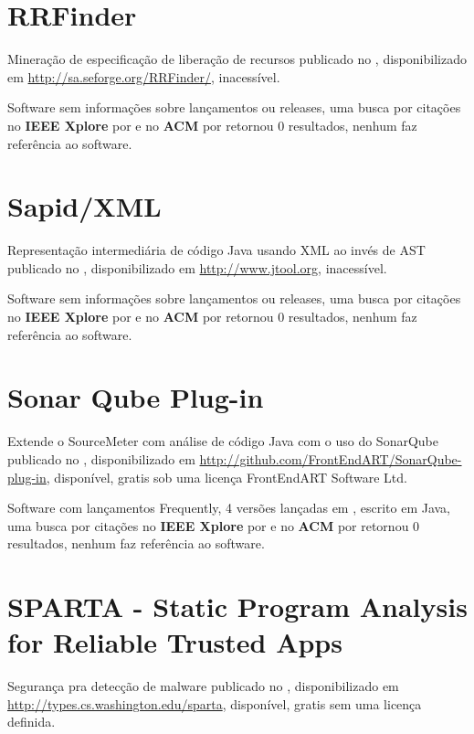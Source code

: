 \section{RRFinder}

Mineração de especificação de liberação de recursos
publicado no  ,
disponibilizado em \url{http://sa.seforge.org/RRFinder/},
inacessível.

Software sem informações sobre lançamentos ou releases,
uma busca por citações no {\bf IEEE Xplore} por
\texttt{}
e no {\bf ACM} por
\texttt{}
retornou
0 resultados,
nenhum faz referência ao software.



\section{Sapid/XML}

Representação intermediária de código Java usando XML ao invés de AST
publicado no  ,
disponibilizado em \url{http://www.jtool.org},
inacessível.

Software sem informações sobre lançamentos ou releases,
uma busca por citações no {\bf IEEE Xplore} por
\texttt{}
e no {\bf ACM} por
\texttt{}
retornou
0 resultados,
nenhum faz referência ao software.



\section{Sonar Qube Plug-in}

Extende o SourceMeter com análise de código Java com o uso do SonarQube
publicado no  ,
disponibilizado em \url{http://github.com/FrontEndART/SonarQube-plug-in},
disponível,
gratis
sob uma licença FrontEndART Software Ltd.

Software com lançamentos Frequently,
4 versões lançadas
em ,
escrito em Java,
uma busca por citações no {\bf IEEE Xplore} por
\texttt{}
e no {\bf ACM} por
\texttt{}
retornou
0 resultados,
nenhum faz referência ao software.



\section{SPARTA - Static Program Analysis for Reliable Trusted Apps}

Segurança pra detecção de malware
publicado no  ,
disponibilizado em \url{http://types.cs.washington.edu/sparta},
disponível,
gratis
sem uma licença definida.


